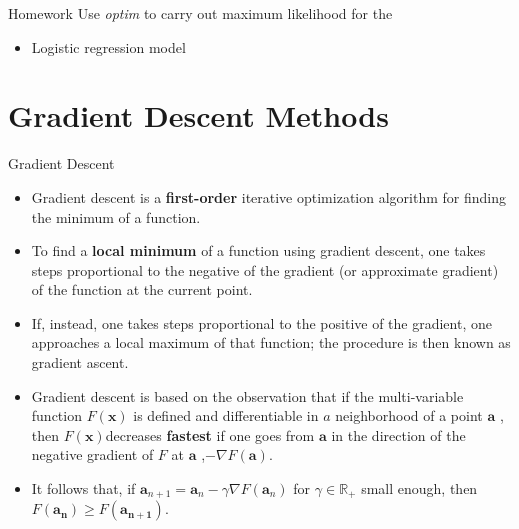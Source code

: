 \documentclass[10pt]{beamer}
\begin{document}
\begin{frame}{Homework}
  Use {\em optim} to carry out maximum likelihood for the
  \begin{itemize}
  \item Logistic regression model
  \end{itemize}
\end{frame}

\section{Gradient Descent Methods}
\begin{frame}[allowframebreaks]{Gradient Descent}


  \begin{itemize}
  \item Gradient descent is a \textbf{first-order} iterative optimization algorithm for finding the minimum of a function.
  \item To find a \textbf{local minimum} of a function using gradient descent, one takes steps proportional to the negative of the gradient (or approximate gradient) of the function at the current point.
  \item If, instead, one takes steps proportional to the positive of the gradient, one
    approaches a local maximum of that function; the procedure is then known as gradient
    ascent.
  \item Gradient descent is based on the observation that if the multi-variable function
    $F(\mathbf {x} )$ is defined and differentiable in $a$
    neighborhood of a point $\mathbf {a}$  , then
      $F(\mathbf {x} )$decreases \textbf{fastest} if one goes from
      $\mathbf {a}$ in the direction of the negative gradient of
      $F$ at $\mathbf {a}$ ,$-\nabla F(\mathbf {a} )$.
    \item It follows that, if $\mathbf {a} _{n+1}=\mathbf {a} _{n}-\gamma \nabla F(\mathbf {a} _{n})$
      for $ \gamma \in \mathbb {R} _{+}$  small enough, then $ F(\mathbf {a_{n}} )\geq F(\mathbf {a_{n+1}} )$.



\end{itemize}
\end{frame}
\end{document}
